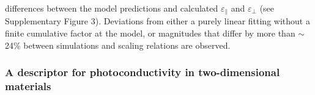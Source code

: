 \documentclass[journal=ancac3,manuscript=article,email=true,hyperref=true,keywords=true]{achemso}
\begin{document}
differences between the model predictions and calculated \(\varepsilon_{\parallel}\) and \(\varepsilon_{\perp}\) (see Supplementary Figure 3). Deviations from either a purely linear fitting without a finite cumulative factor at the model, or 
magnitudes that differ by more than $\sim$24\% between simulations 
and scaling relations are observed. 


\subsubsection{A descriptor for photoconductivity in two-dimensional materials}
\end{document}
